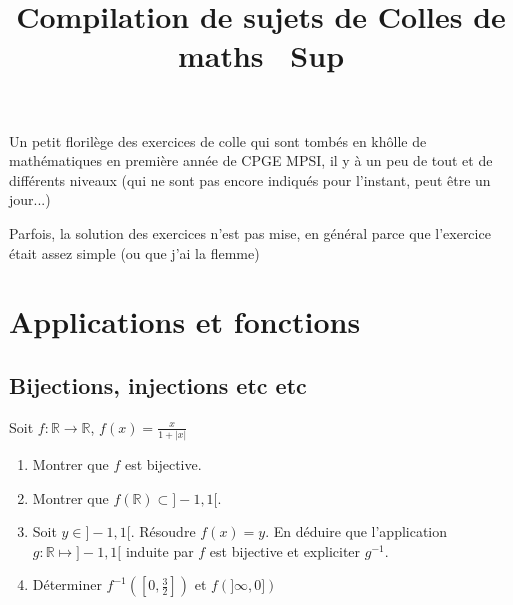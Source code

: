 \documentclass{article}
\title{Compilation de sujets de Colles de maths \textendash~Sup}
\author{ }
\date{ }
\newcommand{\R}{\mathbb{R}}
\newcommand{\abs}[1]{\lvert#1 \rvert}
\begin{document}
\maketitle
Un petit florilège des exercices de colle qui sont tombés en khôlle de mathématiques en première année de CPGE MPSI, il y à un peu de tout et de différents niveaux (qui ne sont pas encore indiqués pour l'instant, peut être un jour...)

Parfois, la solution des exercices n'est pas mise, en général parce que l'exercice était assez simple (ou que j'ai la flemme)


\tableofcontents
\section{Applications et fonctions}
\subsection{Bijections, injections etc etc}

\begin{exercise}
  Soit $f:\R \to \R$, $f(x) = \frac{x}{1+\abs{x}}$
  \begin{enumerate}

    \item Montrer que $f$ est bijective.
  \item Montrer que $f(\R) \subset ]-1,1[$.
  \item Soit $y \in]-1,1[$. Résoudre $f(x) = y$. En déduire que l'application $g:\R \mapsto ]-1,1[$ induite par $f$ est bijective et expliciter $g^{-1}$.
\item Déterminer $f^{-1}\left(\left[0, \frac{3}{2}\right]\right)$ et $f\left(\rbrack\infty,0\rbrack\right)$

  \end{enumerate}
\end{exercise}
\end{document}
